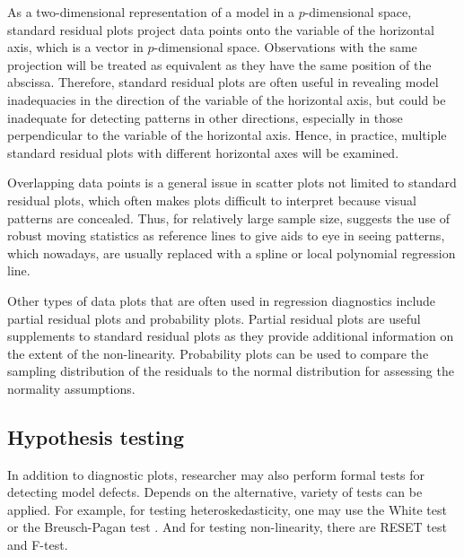 \documentclass[]{interact}
\theoremstyle{plain}%
\theoremstyle{definition}
\theoremstyle{remark}
\begin{document}
As a two-dimensional representation of a model in a \(p\)-dimensional
space, standard residual plots project data points onto the variable of
the horizontal axis, which is a vector in \(p\)-dimensional space.
Observations with the same projection will be treated as equivalent as
they have the same position of the abscissa. Therefore, standard
residual plots are often useful in revealing model inadequacies in the
direction of the variable of the horizontal axis, but could be
inadequate for detecting patterns in other directions, especially in
those perpendicular to the variable of the horizontal axis. Hence, in
practice, multiple standard residual plots with different horizontal
axes will be examined.

Overlapping data points is a general issue in scatter plots not limited
to standard residual plots, which often makes plots difficult to
interpret because visual patterns are concealed. Thus, for relatively
large sample size, \citet{cleveland1975graphical} suggests the use of
robust moving statistics as reference lines to give aids to eye in
seeing patterns, which nowadays, are usually replaced with a spline or
local polynomial regression line.

Other types of data plots that are often used in regression diagnostics
include partial residual plots and probability plots. Partial residual
plots are useful supplements to standard residual plots as they provide
additional information on the extent of the non-linearity. Probability
plots can be used to compare the sampling distribution of the residuals
to the normal distribution for assessing the normality assumptions.

\hypertarget{hypothesis-testing}{%
\subsection{Hypothesis testing}\label{hypothesis-testing}}

In addition to diagnostic plots, researcher may also perform formal
tests for detecting model defects. Depends on the alternative, variety
of tests can be applied. For example, for testing heteroskedasticity,
one may use the White test
\citep{white_heteroskedasticity-consistent_1980} or the Breusch-Pagan
test \citep{breusch_simple_1979}. And for testing non-linearity, there
are RESET test \citep{ramsey_tests_1969} and F-test.
\end{document}
